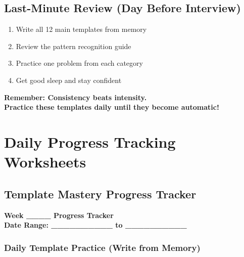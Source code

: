 \documentclass[10pt,a4paper]{article}
\begin{document}
\subsection{Last-Minute Review (Day Before Interview)}
\begin{enumerate}
\item Write all 12 main templates from memory
\item Review the pattern recognition guide
\item Practice one problem from each category
\item Get good sleep and stay confident
\end{enumerate}

\vspace{1cm}
\begin{center}
\textbf{\Large Remember: Consistency beats intensity.}\\
\textbf{\Large Practice these templates daily until they become automatic!}
\end{center}

\newpage
\appendix
\section{Daily Progress Tracking Worksheets}

\subsection{Template Mastery Progress Tracker}

\begin{center}
\textbf{\Large Week \_\_\_\_ Progress Tracker}\\
\textbf{Date Range: \_\_\_\_\_\_\_\_\_\_ to \_\_\_\_\_\_\_\_\_\_}
\end{center}

\subsubsection{Daily Template Practice (Write from Memory)}
\end{document}
